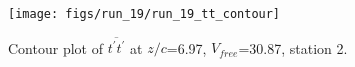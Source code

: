 \begin{figure}[H]
\centering
\texttt{[image: figs/run\_19/run\_19\_tt\_contour]}
\caption{Contour plot of $\overline{t^\prime t^\prime}$ at $z/c$=6.97, $V_{free}$=30.87, station 2.}
\label{fig:run_19_tt_contour}
\end{figure}


